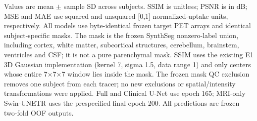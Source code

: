\documentclass{article}
\begin{document}
\begin{table}[t]
\centering
\caption{Mask-restricted quality of frozen two-fold OOF PET predictions.}
\label{tab:r3_11_masked_summary}
\par\smallskip
\begin{minipage}{\textwidth}\footnotesize
Values are mean $\pm$ sample SD across subjects. SSIM is unitless; PSNR is in dB; MSE and MAE use squared and unsquared [0,1] normalized-uptake units, respectively. All models use byte-identical frozen target PET arrays and identical subject-specific masks. The mask is the frozen SynthSeg nonzero-label union, including cortex, white matter, subcortical structures, cerebellum, brainstem, ventricles and CSF; it is not a pure parenchymal mask. SSIM uses the existing E1 3D Gaussian implementation (kernel 7, sigma 1.5, data range 1) and only centers whose entire 7$\times$7$\times$7 window lies inside the mask. The frozen mask QC exclusion removes one subject from each tracer; no new exclusions or spatial/intensity transformations were applied. Full and Clinical U-Net use epoch 165; MRI-only Swin-UNETR uses the prespecified final epoch 200. All predictions are frozen two-fold OOF outputs.
\end{minipage}
\end{table}
\end{document}
